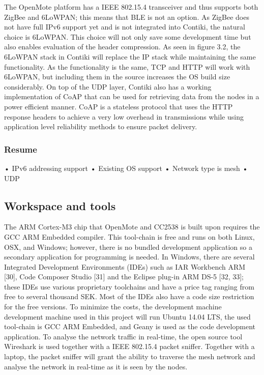 The OpenMote platform has a IEEE 802.15.4 transceiver and thus supports both ZigBee and 6LoWPAN;
	this means that BLE is not an option.
As ZigBee does not have full IPv6 support yet and is not integrated into Contiki,
	the natural choice is 6LoWPAN.
This choice will not only save some development time but also enables evaluation of the header compression.
As seen in figure 3.2,
	the 6LoWPAN stack in Contiki will replace the IP stack while maintaining the same functionality.
As the functionality is the same,
	TCP and HTTP will work with 6LoWPAN,
	but including them in the source increases the OS build size considerably.
On top of the UDP layer,
	Contiki also has a working implementation of CoAP that can be used for retrieving data from the nodes in a power efficient manner.
CoAP is a stateless protocol that uses the HTTP response headers to achieve a very low overhead in transmissions while using application level reliability methods to ensure packet delivery.

\subsubsection*{Resume}
• IPv6 addressing support
• Existing OS support
• Network type is mesh
• UDP


\subsection{Workspace and tools}

The ARM Cortex-M3 chip that OpenMote and CC2538 is built upon requires the GCC ARM Embedded compiler.
This tool-chain is free and runs on both Linux,
	OSX,
	and Windows;
	however,
	there is no bundled development application so a secondary application for programming is needed.
In Windows,
	there are several Integrated Development Environments (IDEs) such as IAR Workbench ARM [30],
	Code Composer Studio [31] and the Eclipse plug-in ARM DS-5 [32, 33];
	these IDEs use various proprietary toolchains and have a price tag ranging from free to several thousand SEK.
Most of the IDEs also have a code size restriction for the free versions.
To minimize the costs,
	the development machine development machine used in this project will run Ubuntu 14.04 LTS,
	the used tool-chain is GCC ARM Embedded,
	and Geany is used as the code development application.
To analyse the network traffic in real-time,
	the open source tool Wireshark is used together with a IEEE 802.15.4 packet sniffer.
Together with a laptop,
	the packet sniffer will grant the ability to traverse the mesh network and analyse the network in real-time as it is seen by the nodes.



